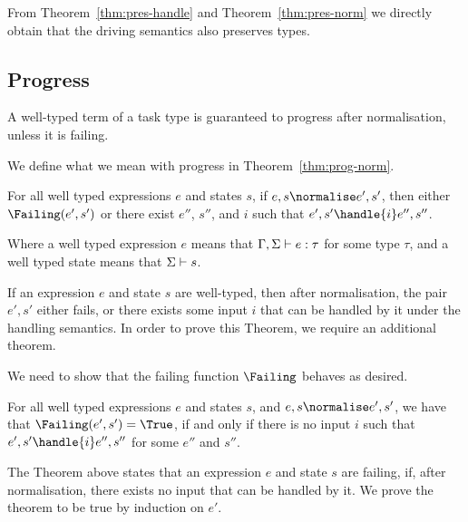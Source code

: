 From Theorem~\ref{thm:pres-handle} and Theorem~\ref{thm:pres-norm} we directly
obtain that the driving semantics also preserves types.

\subsection{Progress}

A well-typed term of a task type is guaranteed to progress after normalisation,
unless it is failing.

We define what we mean with progress in Theorem~\ref{thm:prog-norm}.
\begin{theorem}
  For all well typed expressions $e$ and states $s$,
  if $e,s \normalise e',s'$,
  then either $\Failing(e', s')$
  or there exist $e''$, $s''$, and $i$ such that $e',s'\handle{i} e'',s''$.
  \label{thm:prog-norm}
\end{theorem}

Where a well typed expression $e$ means that $\Gamma,\Sigma\vdash e:\tau$ for
some type $\tau$, and a well typed state means that $\Sigma\vdash s$.

If an expression $e$ and state $s$ are well-typed, then after normalisation, the pair $e',s'$
either fails, or there exists some input $i$ that can be handled by it under the handling semantics.
In order to prove this Theorem, we require an additional theorem.


We need to show that the failing function $\Failing$ behaves as desired.

\begin{theorem}
  For all well typed expressions $e$ and states $s$,
  and $e,s \normalise e',s'$,
  we have that $\Failing(e',s') = \True$,
  if and only if there is no input $i$
  such that $e',s'\handle{i} e'',s''$ for some $e''$ and $s''$.
  \label{thm:failing}
\end{theorem}

The Theorem above states that an expression $e$ and state $s$ are failing, if,
after normalisation, there exists no input that can be handled by it.
We prove the theorem to be true by induction on $e'$.

